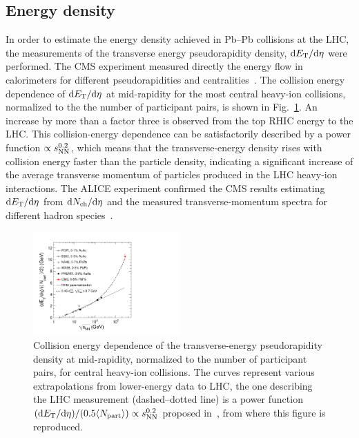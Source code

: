 \subsection{Energy density}
\label{subsecks:energydensity}

In order to estimate the energy density achieved in Pb--Pb collisions at the LHC, the measurements of the transverse energy pseudorapidity density, ${\rm d}E_{\rm T}/{\rm d}\eta$ were performed. The CMS experiment measured directly the energy flow in calorimeters for different pseudorapidities and centralities~\cite{Chatrchyan:2012mb}. The collision energy dependence of ${\rm d}E_{\rm T}/{\rm d}\eta$ at mid-rapidity for the most central heavy-ion collisions, normalized to the the number of participant pairs, is shown in Fig.~\ref{figks:ETvsEnerg}. An increase by more than a factor three is observed from the top RHIC energy to the LHC. This collision-energy dependence can be satisfactorily described by a power function $\propto s_{\rm NN}^{0.2}$, which means that the transverse-energy density rises with collision energy faster than the particle density, indicating a significant increase of the average transverse momentum of particles produced in the LHC heavy-ion interactions. The ALICE experiment confirmed the CMS results estimating ${\rm d}E_{\rm T}/{\rm d}\eta$ from ${\rm d}N_{\rm ch}/{\rm d}\eta$ and the measured transverse-momentum spectra for different hadron species~\cite{Collaboration:2011rta}.

\begin{figure}
\centering
\includegraphics[width=0.5\textwidth]{ksfigures/CMSETvsEnerg.pdf}
\caption{Collision energy dependence of the transverse-energy pseudorapidity density at mid-rapidity, normalized to the number of participant pairs, for central heavy-ion collisions. The curves represent various extrapolations from lower-energy data to LHC, the one describing the LHC measurement (dashed--dotted line) is a power function $({\rm d}E_{\rm T}/{\rm d}\eta)/(0.5 \langle N_{\rm part} \rangle) \propto s_{\rm NN}^{0.2}$ proposed in~\cite{Chatrchyan:2012mb}, from where this figure is reproduced.}
\label{figks:ETvsEnerg}
\end{figure}

